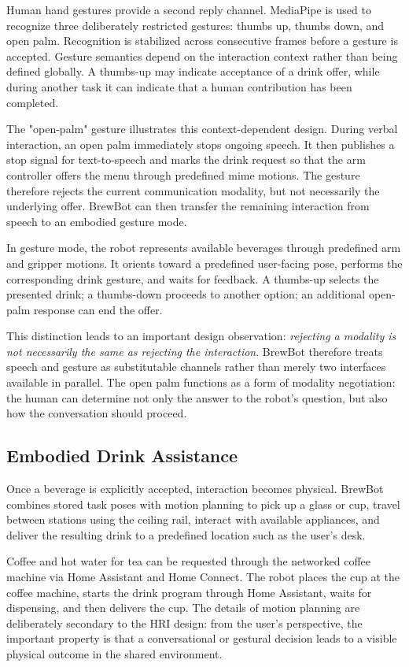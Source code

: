 Human hand gestures provide a second reply channel. MediaPipe
\cite{lugaresi2019mediapipe} is used to recognize three deliberately restricted
gestures: thumbs up, thumbs down, and open palm. Recognition is stabilized
across consecutive frames before a gesture is accepted. Gesture semantics depend
on the interaction context rather than being defined globally. A thumbs-up may
indicate acceptance of a drink offer, while during another task it can indicate
that a human contribution has been completed.

The "open-palm" gesture illustrates this context-dependent design. During verbal 
interaction, an open palm immediately stops ongoing speech. It then publishes 
a stop signal for text-to-speech and marks the drink request so that the arm 
controller offers the menu through predefined mime motions. The gesture therefore 
rejects the current communication modality, but not necessarily the underlying 
offer. BrewBot can then transfer the remaining interaction from speech to an 
embodied gesture mode.

In gesture mode, the robot represents available beverages through predefined arm
and gripper motions. It orients toward a predefined user-facing pose, performs
the corresponding drink gesture, and waits for feedback. A thumbs-up selects the
presented drink; a thumbs-down proceeds to another option; an additional
open-palm response can end the offer.

This distinction leads to an important design observation: \emph{rejecting a
modality is not necessarily the same as rejecting the interaction}. BrewBot
therefore treats speech and gesture as substitutable channels rather than merely
two interfaces available in parallel. The open palm functions as a form of
modality negotiation: the human can determine not only the answer to the robot's
question, but also how the conversation should proceed.

\subsection{Embodied Drink Assistance}

Once a beverage is explicitly accepted, interaction becomes physical. BrewBot 
combines stored task poses with motion planning to pick up a glass or cup, 
travel between stations using the ceiling rail, interact with available 
appliances, and deliver the resulting drink to a predefined location such as 
the user's desk.

Coffee and hot water for tea can be requested through the networked coffee
machine via Home Assistant and Home Connect. The robot places the cup at the 
coffee machine, starts the drink program through Home Assistant, waits for 
dispensing, and then delivers the cup. The details of motion planning are 
deliberately secondary to the HRI design: from the user's perspective, the 
important property is that a conversational or gestural decision leads to a 
visible physical outcome in the shared environment.

